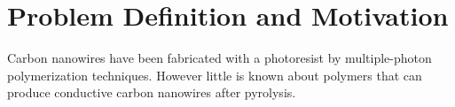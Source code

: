 
\chapter{Problem Definition and Motivation} %

\label{Chapter:ProblemDefinitionandMotivation}

Carbon nanowires have been fabricated with a photoresist by multiple-photon polymerization techniques. However little is known about polymers that can produce conductive carbon nanowires after pyrolysis. 






